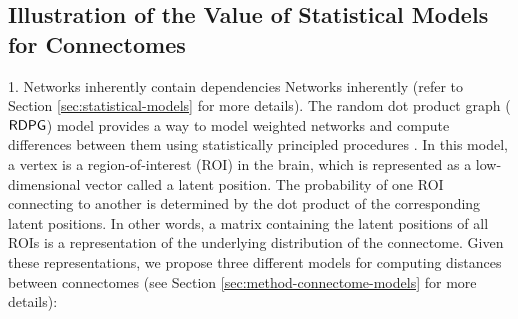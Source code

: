 \subsection{Illustration of the Value of Statistical Models for Connectomes} \label{sec:heritability_models}

1. Networks inherently contain dependencies 
Networks inherently 
(refer to Section \ref{sec:statistical-models} for more details).
The random dot product graph ($\operatorname{\mathsf{RDPG}}$) model provides a way to model weighted networks and compute differences between them using statistically principled procedures \cite{Young_Scheinerman_2007, sussman2012consistent, tang2017, tang2017nonparametric}. In this model, a vertex is a region-of-interest (ROI) in the brain, which is represented as a low-dimensional vector called a latent position. The probability of one ROI connecting to another is determined by the dot product of the corresponding latent positions. In other words, a matrix containing the latent positions of all ROIs is a representation of the underlying distribution of the connectome. Given these representations, we propose three different models for computing distances between connectomes (see Section \ref{sec:method-connectome-models} for more details):
